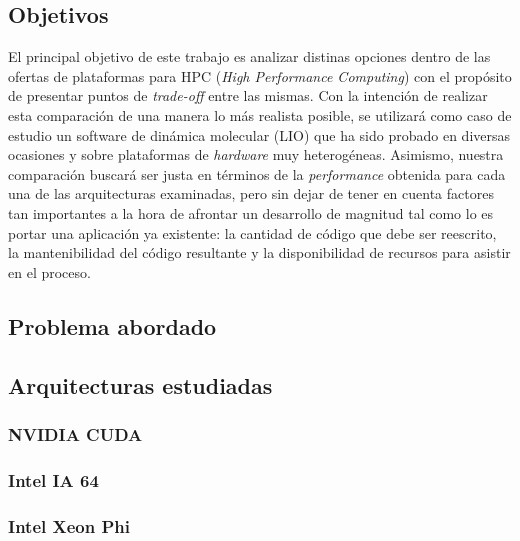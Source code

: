\subsection{Objetivos}

El principal objetivo de este trabajo es analizar distinas opciones dentro de
las ofertas de plataformas para HPC (\textit{High Performance Computing}) con
el propósito de presentar puntos de \textit{trade-off} entre las mismas. Con la
intención de realizar esta comparación de una manera lo más realista posible,
se utilizará como caso de estudio un software de dinámica molecular (LIO) que
ha sido probado en diversas ocasiones y sobre plataformas de \textit{hardware}
muy heterogéneas. Asimismo, nuestra comparación buscará ser justa en términos
de la \textit{performance} obtenida para cada una de las arquitecturas
examinadas, pero sin dejar de tener en cuenta factores tan importantes a la
hora de afrontar un desarrollo de magnitud tal como lo es portar una
aplicación ya existente: la cantidad de código que debe ser reescrito, la
mantenibilidad del código resultante y la disponibilidad de recursos para
asistir en el proceso.

\subsection{Problema abordado}

\subsection{Arquitecturas estudiadas}

\subsubsection{NVIDIA CUDA}

\subsubsection{Intel IA 64}

\subsubsection{Intel Xeon Phi}


